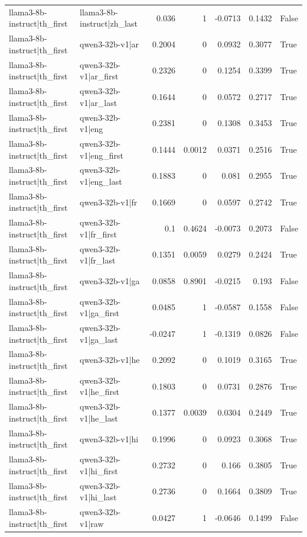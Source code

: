 \begin{table}
\begin{tabular}{l l r r r r l}
llama3-8b-instruct|th_first & llama3-8b-instruct|zh_last & 0.036 & 1 & -0.0713 & 0.1432 & False \\
llama3-8b-instruct|th_first & qwen3-32b-v1|ar & 0.2004 & 0 & 0.0932 & 0.3077 & True \\
llama3-8b-instruct|th_first & qwen3-32b-v1|ar_first & 0.2326 & 0 & 0.1254 & 0.3399 & True \\
llama3-8b-instruct|th_first & qwen3-32b-v1|ar_last & 0.1644 & 0 & 0.0572 & 0.2717 & True \\
llama3-8b-instruct|th_first & qwen3-32b-v1|eng & 0.2381 & 0 & 0.1308 & 0.3453 & True \\
llama3-8b-instruct|th_first & qwen3-32b-v1|eng_first & 0.1444 & 0.0012 & 0.0371 & 0.2516 & True \\
llama3-8b-instruct|th_first & qwen3-32b-v1|eng_last & 0.1883 & 0 & 0.081 & 0.2955 & True \\
llama3-8b-instruct|th_first & qwen3-32b-v1|fr & 0.1669 & 0 & 0.0597 & 0.2742 & True \\
llama3-8b-instruct|th_first & qwen3-32b-v1|fr_first & 0.1 & 0.4624 & -0.0073 & 0.2073 & False \\
llama3-8b-instruct|th_first & qwen3-32b-v1|fr_last & 0.1351 & 0.0059 & 0.0279 & 0.2424 & True \\
llama3-8b-instruct|th_first & qwen3-32b-v1|ga & 0.0858 & 0.8901 & -0.0215 & 0.193 & False \\
llama3-8b-instruct|th_first & qwen3-32b-v1|ga_first & 0.0485 & 1 & -0.0587 & 0.1558 & False \\
llama3-8b-instruct|th_first & qwen3-32b-v1|ga_last & -0.0247 & 1 & -0.1319 & 0.0826 & False \\
llama3-8b-instruct|th_first & qwen3-32b-v1|he & 0.2092 & 0 & 0.1019 & 0.3165 & True \\
llama3-8b-instruct|th_first & qwen3-32b-v1|he_first & 0.1803 & 0 & 0.0731 & 0.2876 & True \\
llama3-8b-instruct|th_first & qwen3-32b-v1|he_last & 0.1377 & 0.0039 & 0.0304 & 0.2449 & True \\
llama3-8b-instruct|th_first & qwen3-32b-v1|hi & 0.1996 & 0 & 0.0923 & 0.3068 & True \\
llama3-8b-instruct|th_first & qwen3-32b-v1|hi_first & 0.2732 & 0 & 0.166 & 0.3805 & True \\
llama3-8b-instruct|th_first & qwen3-32b-v1|hi_last & 0.2736 & 0 & 0.1664 & 0.3809 & True \\
llama3-8b-instruct|th_first & qwen3-32b-v1|raw & 0.0427 & 1 & -0.0646 & 0.1499 & False \\

\end{tabular}
\end{table}
